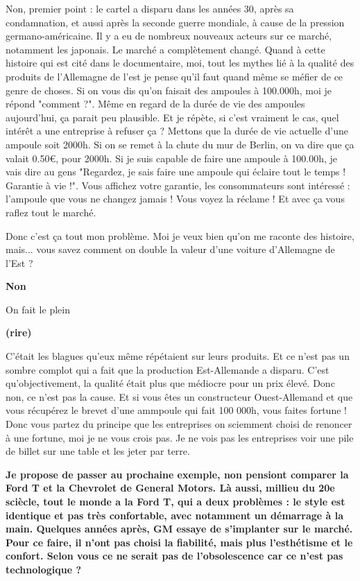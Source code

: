 \begin{small}
Non, premier point : le cartel a disparu dans les années 30, après sa condamnation, et aussi après la seconde guerre mondiale, à cause de la pression germano-américaine. Il y a eu de nombreux nouveaux acteurs sur ce marché, notamment les japonais. Le marché a complètement changé.
Quand à cette histoire qui est cité dans le documentaire, moi, tout les mythes lié à la qualité des produits de l'Allemagne de l'est  je pense qu'il faut quand même se méfier de ce genre de choses.
Si on vous dis qu'on faisait des ampoules à 100.000h, moi je répond "comment ?". Même en regard de la durée de vie des ampoules aujourd’hui, ça parait peu plausible.
Et je répète, si c'est vraiment le cas, quel intérêt a une entreprise à refuser ça ?
Mettons que la durée de vie actuelle d'une ampoule soit 2000h. Si on se remet à la chute du mur de Berlin, on va dire que ça valait 0.50\euro, pour 2000h.
Si je suis capable de faire une ampoule à 100.00h, je vais dire au gens "Regardez, je sais faire une ampoule qui éclaire tout le temps ! Garantie à vie !". Vous affichez votre garantie, les consommateurs sont intéressé : l'ampoule que vous ne changez jamais ! Vous voyez la réclame !
Et avec ça vous raflez tout le marché.

Donc c'est ça tout mon problème. Moi je veux bien qu'on me raconte des histoire, mais... vous savez comment on double la valeur d'une voiture d'Allemagne de l'Est ?

\textbf{Non}
\smallbreak


On fait le plein

\textbf{(rire) }
\smallbreak


C'était les blagues qu'eux même répétaient sur leurs produits. Et ce n'est pas un sombre complot qui a fait que la production Est-Allemande a disparu. C'est qu'objectivement, la qualité était plus que médiocre pour un prix élevé. Donc non, ce n'est pas la cause. Et si vous êtes un constructeur Ouest-Allemand et que vous récupérez le brevet d'une ammpoule qui fait 100 000h, vous faites fortune !
Donc vous partez du principe que les entreprises on sciemment choisi de renoncer à une fortune, moi je ne vous crois pas. Je ne vois pas les entreprises voir une pile de billet sur une table et les jeter par terre.

\textbf{Je propose de passer au prochaine exemple, non pensiont comparer la Ford T et la Chevrolet de General Motors. Là aussi, millieu du 20e sciècle, tout le monde a la Ford T, qui a deux problèmes : le style  est identique et pas très confortable, avec notamment un démarrage à la main. Quelques années après, GM essaye de s'implanter sur le marché. Pour ce faire, il n'ont pas choisi la fiabilité, mais plus l'esthétisme et le confort. Selon vous ce ne serait pas de l'obsolescence car ce n'est pas technologique ?}
\smallbreak



\end{small}
